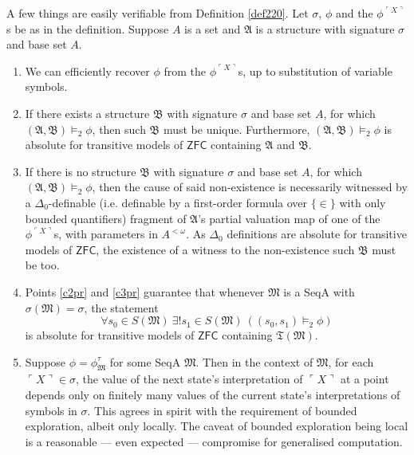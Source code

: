\documentclass[12pt, twoside]{memoir}
\numberwithin{equation}{section}
\theoremstyle{definition}
\theoremstyle{remark}
\theoremstyle{definition}
\theoremstyle{definition}
\theoremstyle{definition}
\theoremstyle{remark}
\begin{document}
A few things are easily verifiable from Definition \ref{def220}. Let $\sigma$, $\phi$ and the $\phi^{\ulcorner X \urcorner}$s be as in the definition. Suppose $A$ is a set and $\mathfrak{A}$ is a structure with signature $\sigma$ and base set $A$.
\begin{enumerate}[label=(C\arabic*)]
    \item We can efficiently recover $\phi$ from the $\phi^{\ulcorner X \urcorner}$s, up to substitution of variable symbols.
    \item\label{c2pr} If there exists a structure $\mathfrak{B}$ with signature $\sigma$ and base set $A$, for which $(\mathfrak{A}, \mathfrak{B}) \models_2 \phi$, then such $\mathfrak{B}$ must be unique. Furthermore, $(\mathfrak{A}, \mathfrak{B}) \models_2 \phi$ is absolute for transitive models of $\mathsf{ZFC}$ containing $\mathfrak{A}$ and $\mathfrak{B}$.
    \item\label{c3pr} If there is no structure $\mathfrak{B}$ with signature $\sigma$ and base set $A$, for which $(\mathfrak{A}, \mathfrak{B}) \models_2 \phi$, then the cause of said non-existence is necessarily witnessed by a $\Delta_0$-definable (i.e. definable by a first-order formula over $\{\in\}$ with only bounded quantifiers) fragment of $\mathfrak{A}$'s partial valuation map of one of the $\phi^{\ulcorner X \urcorner}$s, with parameters in $A^{< \omega}$. As $\Delta_0$ definitions are absolute for transitive models of $\mathsf{ZFC}$, the existence of a witness to the non-existence such $\mathfrak{B}$ must be too.
    \item\label{c4pr} Points \ref{c2pr} and \ref{c3pr} guarantee that whenever $\mathfrak{M}$ is a SeqA with $\sigma(\mathfrak{M}) = \sigma$, the statement
    \begin{equation*}
        \forall s_0 \in S(\mathfrak{M}) \ \exists ! s_1 \in S(\mathfrak{M}) \ ((s_0, s_1) \models_2 \phi)
    \end{equation*}
    is absolute for transitive models of $\mathsf{ZFC}$ containing $\mathfrak{T}(\mathfrak{M})$.
    \item Suppose $\phi = \phi^{\tau}_{\mathfrak{M}}$ for some SeqA $\mathfrak{M}$. Then in the context of $\mathfrak{M}$, for each $\ulcorner X \urcorner \in \sigma$, the value of the next state's interpretation of $\ulcorner X \urcorner$ at a point depends only on finitely many values of the current state's interpretations of symbols in $\sigma$. This agrees in spirit with the requirement of bounded exploration, albeit only locally. The caveat of bounded exploration being local is a reasonable --- even expected --- compromise for generalised computation.
\end{enumerate}
\end{document}
